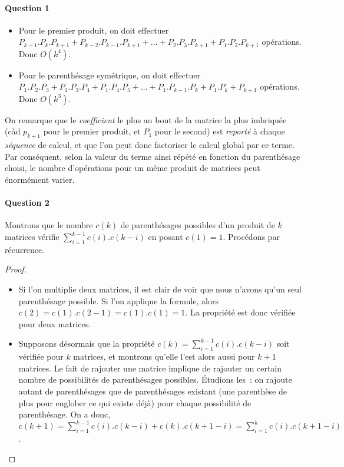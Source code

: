 \paragraph{Question 1}

\begin{itemize}
\item Pour le premier produit, on doit effectuer $P_{k-1}.P_k.P_{k+1}
  + P_{k-2}.P_{k-1}.P_{k+1} + \dots + P_2.P_3.P_{k+1} +
  P_1.P_2.P_{k+1}$ opérations. Donc $O(k^4)$.
\item Pour le parenthésage symétrique, on doit effectuer $P_1.P_2.P_3
  + P_1.P_3.P_4 + P_1.P_4.P_5 + \dots + P_1.P_{k-1}.P_{k} +
  P_1.P_k+P_{k+1}$ opérations. Donc $O(k^3)$.
\end{itemize}

On remarque que le \textit{coefficient} le plus au bout de la matrice
la plus imbriquée (càd $p_{k+1}$ pour le premier produit, et $P_1$
pour le second) est \textit{reporté} à chaque \textit{séquence} de
calcul, et que l'on peut donc factoriser le calcul global par ce
terme. Par conséquent, selon la valeur du terme ainsi répété en
fonction du parenthésage choisi, le nombre d'opérations pour un même
produit de matrices peut énormément varier.

\paragraph{Question 2}

Montrons que le nombre $c(k)$ de parenthésages possibles d'un produit
de $k$ matrices vérifie $\sum_{i=1}^{k-1}c(i).c(k-i)$ en posant
$c(1)=1$. Procédons par récurrence.

\begin{proof}
\begin{itemize}
\item Si l'on multiplie deux matrices, il est clair de voir que nous
  n'avons qu'un seul parenthésage possible. Si l'on applique la
  formule, alors $c(2) = c(1).c(2-1) = c(1).c(1) = 1$. La propriété
  est donc vérifiée pour deux matrices.
\item Supposons désormais que la propriété $c(k) =
  \sum_{i=1}^{k-1}c(i).c(k-i)$ soit vérifiée pour $k$ matrices, et
  montrons qu'elle l'est alors aussi pour $k+1$ matrices. Le fait de
  rajouter une matrice implique de rajouter un certain nombre de
  possibilités de parenthésages possibles. Étudions les~: on rajoute
  autant de parenthésages que de parenthésages existant (une
  parenthèse de plus pour englober ce qui existe déjà) pour chaque
  possibilité de parenthésage. On a donc, $c(k+1)
  =\sum_{i=1}^{k-1}c(i).c(k-i)+c(k).c(k+1-i)= \sum_{i=1}^{k}c(i).c(k+1-i)$.
\end{itemize}
\end{proof}

